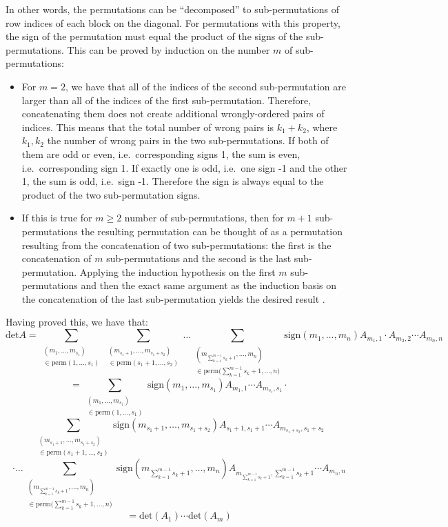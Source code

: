 \begin{solution}
    In other words, the permutations can be ``decomposed'' to sub-permutations of row indices of each block on the diagonal. For permutations with this property, the sign of the permutation must equal the product of the signs of the sub-permutations. This can be proved by induction on the number $m$ of sub-permutations:
    \begin{itemize}
        \item For $m=2$, we have that all of the indices of the second sub-permutation are larger than all of the indices of the first sub-permutation. Therefore, concatenating them does not create additional wrongly-ordered pairs of indices. This means that the total number of wrong pairs is $k_1+k_2$, where $k_1, k_2$ the number of wrong pairs in the two sub-permutations. If both of them are odd or even, i.e.\ corresponding signs 1, the sum is even, i.e.\ corresponding sign 1. If exactly one is odd, i.e.\ one sign -1 and the other 1, the sum is odd, i.e.\ sign -1. Therefore the sign is always equal to the product of the two sub-permutation signs.
        \item If this is true for $m \geq 2$ number of sub-permutations, then for $m+1$ sub-permutations the resulting permutation can be thought of as a permutation resulting from the concatenation of two sub-permutations: the first is the concatenation of $m$ sub-permutations and the second is the last sub-permutation. Applying the induction hypothesis on the first $m$ sub-permutations and then the exact same argument as the induction basis on the concatenation of the last sub-permutation yields the desired result .
    \end{itemize}

    Having proved this, we have that:
    $$\text{det} A = \sum_{\substack{(m_1, \ldots, m_{s_1}) \\ \in \text{perm}(1, \ldots, s_1)}} \sum_{\substack{(m_{s_1+1}, \ldots, m_{s_1+s_2}) \\ \in \text{perm}(s_1+1, \ldots, s_2)}} \ldots \sum_{\substack{(m_{\sum_{k=1}^{m-1}s_k+1}, \ldots, m_n) \\ \in \text{perm}({\sum_{k=1}^{m-1}s_k+1, \ldots, n)}}} \text{sign}(m_1, \ldots, m_n) A_{m_1, 1} \cdot A_{m_2, 2} \cdots A_{m_n, n}$$
    $$= \sum_{\substack{(m_1, \ldots, m_{s_1}) \\ \in \text{perm}(1, \ldots, s_1)}} \text{sign}(m_1, \ldots, m_{s_1}) A_{m_1, 1} \cdots A_{m_{s_1}, s_1} \cdot$$
    $$\sum_{\substack{(m_{s_1+1}, \ldots, m_{s_1+s_2}) \\ \in \text{perm}(s_1+1, \ldots, s_2)}} \text{sign}(m_{s_1+1}, \ldots, m_{s_1+s_2}) A_{s_1+1, s_1+1} \cdots A_{m_{s_1+s_2}, s_1+s_2}$$
    $$\cdot \ldots \sum_{\substack{(m_{\sum_{k=1}^{m-1}s_k+1}, \ldots, m_n) \\ \in \text{perm}({\sum_{k=1}^{m-1}s_k+1, \ldots, n)}}} \text{sign}(m_{\sum_{k=1}^{m-1}s_k+1}, \ldots, m_n)A_{m_{\sum_{k=1}^{m-1}s_k+1}, {\sum_{k=1}^{m-1}s_k+1}} \cdots A_{m_n, n}$$
    $$= \text{det}(A_1) \cdots \text{det}(A_m)$$
\end{solution}

